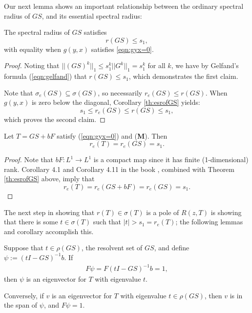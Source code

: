 Our next lemma shows an important relationship between the ordinary spectral radius of $GS$, and its essential spectral radius:

\begin{lemma} \label{th:srofGS}
	The spectral radius of $GS$ satisfies
	\[r(GS) \leq s_1,\]
	with equality when $g(y,x)$ satisfies \eqref{eqn:gyx=0}.
\end{lemma}

\begin{proof}
	Noting that $||(GS)^k||_1 \leq s_1^k ||G^k||_1 = s_1^k$ for all $k$, we have by Gelfand's formula (\ref{eqn:gelfand}) that $r(GS)\leq s_1$, which demonstrates the first claim.
	
	Note that $\sigma_e(GS) \subseteq \sigma(GS)$, so necessarily $r_e(GS) \leq r(GS)$. When $g(y,x)$ is zero below the diagonal, Corollary \ref{th:esrofGS} yields:
	\[s_1 \leq r_e(GS) \leq r(GS) \leq s_1,\]
	which proves the second claim.
	
\end{proof}

\begin{lemma} \label{th:reiss1}
	Let $T = GS + bF$ satisfy (\ref{eqn:gyx=0}) and (\textbf{M}). Then 
	\[r_e(T) = r_e(GS) = s_1.\]
\end{lemma}

\begin{proof}
	Note that $bF:L^1 \to L^1$ is a compact map since it has finite (1-dimensional) rank. Corollary 4.1 and Corollary 4.11 in the book \cite{Edmunds1987}, combined with Theorem \ref{th:esrofGS} above, imply that
	\[r_e(T) = r_e(GS + bF) = r_e(GS) = s_1.\]
	
\end{proof}

The next step in showing that $r(T) \in \sigma(T)$ is a pole of $R(z, T)$ is showing that there is some $t \in \sigma(T)$ such that $|t| > s_1 = r_e(T)$; the following lemmas and corollary accomplish this.

\begin{lemma} \label{th:eigenvector}
	Suppose that $t \in \rho(GS)$, the resolvent set of $GS$, and define $\psi:= (t I - GS)^{-1}b$. If
	\begin{align}
	F \psi = F(t I - GS)^{-1}b = 1, \label{eqn:evecformula}
	\end{align}
	then $\psi$ is an eigenvector for $T$ with eigenvalue $t$.
	
	Conversely, if $v$ is an eigenvector for $T$ with eigenvalue $t \in \rho(GS)$, then $v$ is in the span of $\psi$, and $F\psi = 1$.
\end{lemma}

